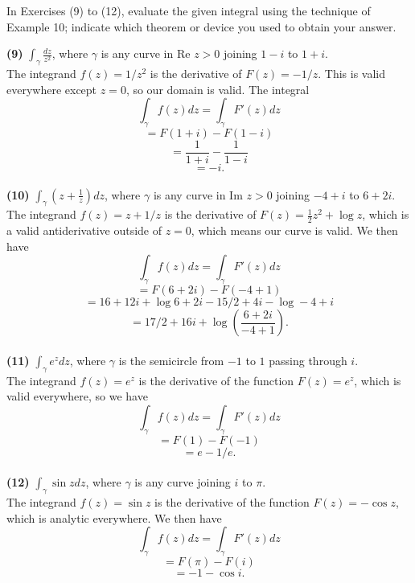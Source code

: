 \documentclass[12pt,letterpaper]{article}
\begin{document}
In Exercises (9) to (12), evaluate the given integral using the technique of Example 10; indicate which theorem or device you used to obtain your answer.

\textbf{(9)} \(\int_{\gamma} \frac{dz}{z^{2}}\), where \(\gamma\) is any curve in Re \(z > 0\) joining \(1 - i\) to \(1 + i\). \\

The integrand \(f(z) = 1/z^{2}\) is the derivative of \(F(z) = -1/z\). This is valid everywhere except \(z=0\), so our domain is valid. The integral \[\int_{\gamma} f(z)dz = \int_{\gamma} F'(z)dz\]\[=F(1+i)-F(1-i)\]\[=\frac{1}{1+i} - \frac{1}{1-i}\]\[=-i.\] \\

\textbf{(10)} \(\int_{\gamma}\left(z+\frac{1}{z}\right)dz\), where \(\gamma\) is any curve in Im \(z > 0\) joining \(-4+i\) to \(6+2i\). \\

The integrand \(f(z) = z + 1/z\) is the derivative of \(F(z) = \frac{1}{2}z^{2} + \log z\), which is a valid antiderivative outside of \(z=0\), which means our curve is valid. We then have \[\int_{\gamma}f(z)dz = \int_{\gamma} F'(z)dz\] \[= F(6+2i) - F(-4+1)\]\[= 16+12i + \log 6+2i - 15/2 +4i - \log -4+i\] \[=17/2 + 16 i + \log \left(\frac{6+2i}{-4+1}\right).\]\\

\textbf{(11)} \(\int_{\gamma} e^{z} dz\), where \(\gamma\) is the semicircle from \(-1\) to \(1\) passing through \(i\). \\

The integrand \(f(z) = e^{z}\) is the derivative of the function \(F(z) = e^{z}\), which is valid everywhere, so we have \[\int_{\gamma} f(z)dz = \int_{\gamma} F'(z)dz\] \[= F(1) - F(-1)\] \[=e - 1/e.\] \\

\textbf{(12)} \(\int_{\gamma} \sin z dz\), where \(\gamma\) is any curve joining \(i\) to \(\pi\). \\

The integrand \(f(z) = \sin z\) is the derivative of the function \(F(z) = -\cos z\), which is analytic everywhere. We then have \[\int_{\gamma} f(z)dz = \int_{\gamma} F'(z)dz\] \[= F(\pi) - F(i)\] \[=-1-\cos i.\]
\end{document}

